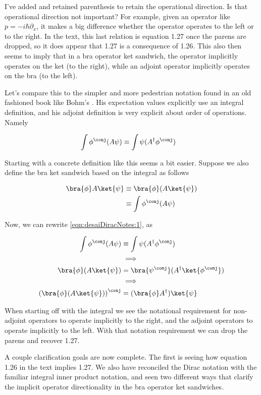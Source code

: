 I've added and retained parenthesis to retain the operational direction.  Is that operational direction not important?  For example, given an operator like $p = -i \hbar \partial_x$, it makes a big difference whether the operator operates to the left or to the right.  In the text, this last relation is equation 1.27 once the parens are dropped, so it does appear that 1.27 is a consequence of 1.26.  This also then seems to imply that in a bra operator ket sandwich, the operator implicitly operates on the ket (to the right), while an adjoint operator implicitly operates on the bra (to the left).

Let's compare this to the simpler and more pedestrian notation found in an old fashioned book like Bohm's \cite{bohm1989qt}.  His expectation values explicitly use an integral definition, and his adjoint definition is very explicit about order of operations.  Namely

\begin{align}\label{eqn:desaiDiracNotes:1}
\int \phi^\conj (A \psi) 
&\equiv \int \psi (A^\dagger \phi^\conj) 
\end{align}

Starting with a concrete definition like this seems a bit easier.  Suppose we also define the bra ket sandwich based on the integral as follows

\begin{align*}
\bra{\phi} A \ket{\psi} 
&\equiv \bra{\phi} (A \ket{\psi}) \\
&\equiv \int \phi^\conj (A \psi) \\
\end{align*}

Now, we can rewrite \ref{eqn:desaiDiracNotes:1}, as 

\begin{align*}
\int \phi^\conj (A \psi)   &\equiv \int \psi (A^\dagger \phi^\conj) \\
&\implies \\
\bra{\phi} (A \ket{\psi})  &= \bra{\psi^\conj} ( A^\dagger \ket{\phi^\conj} ) \\
&\implies \\
\left(\bra{\phi} (A \ket{\psi}) \right)^\conj  &= ( \bra{\phi} A^\dagger ) \ket{\psi}
\end{align*}

When starting off with the integral we see the notational requirement for non-adjoint operators to operate implicitly to the right, and the adjoint operators to operate implicitly to the left.  With that notation requirement we can drop the parens and recover 1.27.

A couple clarification goals are now complete.  The first is seeing how equation 1.26 in the text implies 1.27.  We also have reconciled the Dirac notation with the familiar integral inner product notation, and seen two different ways that clarify the implicit operator directionality in the bra operator ket sandwiches.

\EndArticle
